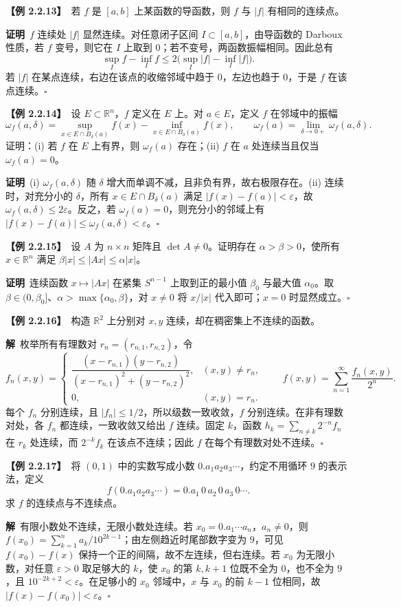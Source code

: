 \documentclass[UTF8,a4paper,11pt]{ctexart}
\newcommand{\ex}[1]{\par\medskip\noindent\textbf{【例 #1】}\ }
\newcommand{\pf}{\par\noindent\textbf{证明}\ }
\newcommand{\sol}{\par\noindent\textbf{解}\ }
\begin{document}
\ex{2.2.13}若 $f$ 是 $[a,b]$ 上某函数的导函数，则 $f$ 与 $|f|$ 有相同的连续点。
\pf $f$ 连续处 $|f|$ 显然连续。对任意闭子区间 $I\subset[a,b]$，由导函数的 Darboux 性质，若 $f$ 变号，则它在 $I$ 上取到 $0$；若不变号，两函数振幅相同。因此总有
\[
\sup_I f-\inf_I f\le 2\bigl(\sup_I|f|-\inf_I|f|\bigr).
\]
若 $|f|$ 在某点连续，右边在该点的收缩邻域中趋于 $0$，左边也趋于 $0$，于是 $f$ 在该点连续。\hfill$\square$

\ex{2.2.14}设 $E\subset\mathbb R^n$，$f$ 定义在 $E$ 上。对 $a\in E$，定义 $f$ 在邻域中的振幅
\[
\omega_f(a,\delta)=\sup_{x\in E\cap B_\delta(a)}f(x)-\inf_{x\in E\cap B_\delta(a)}f(x),\qquad
\omega_f(a)=\lim_{\delta\to0+}\omega_f(a,\delta).
\]
证明：(i) 若 $f$ 在 $E$ 上有界，则 $\omega_f(a)$ 存在；(ii) $f$ 在 $a$ 处连续当且仅当 $\omega_f(a)=0$。
\pf (i) $\omega_f(a,\delta)$ 随 $\delta$ 增大而单调不减，且非负有界，故右极限存在。(ii) 连续时，对充分小的 $\delta$，所有 $x\in E\cap B_\delta(a)$ 满足 $|f(x)-f(a)|<\varepsilon$，故 $\omega_f(a,\delta)\le2\varepsilon$。反之，若 $\omega_f(a)=0$，则充分小的邻域上有 $|f(x)-f(a)|\le\omega_f(a,\delta)<\varepsilon$。\hfill$\square$

\ex{2.2.15}设 $A$ 为 $n\times n$ 矩阵且 $\det A\ne0$。证明存在 $\alpha>\beta>0$，使所有 $x\in\mathbb R^n$ 满足 $\beta|x|\le|Ax|\le\alpha|x|$。
\pf 连续函数 $x\mapsto|Ax|$ 在紧集 $S^{n-1}$ 上取到正的最小值 $\beta_0$ 与最大值 $\alpha_0$。取 $\beta\in(0,\beta_0]$、$\alpha>\max\{\alpha_0,\beta\}$，对 $x\ne0$ 将 $x/|x|$ 代入即可；$x=0$ 时显然成立。\hfill$\square$

\ex{2.2.16}构造 $\mathbb R^2$ 上分别对 $x,y$ 连续，却在稠密集上不连续的函数。
\sol 枚举所有有理数对 $r_n=(r_{n,1},r_{n,2})$，令
\[
f_n(x,y)=\begin{cases}
\dfrac{(x-r_{n,1})(y-r_{n,2})}{(x-r_{n,1})^2+(y-r_{n,2})^2},&(x,y)\ne r_n,\\[3pt]
0,&(x,y)=r_n.
\end{cases}
\qquad f(x,y)=\sum_{n=1}^{\infty}\frac{f_n(x,y)}{2^n}.
\]
每个 $f_n$ 分别连续，且 $|f_n|\le1/2$，所以级数一致收敛，$f$ 分别连续。在非有理数对处，各 $f_n$ 都连续，一致收敛又给出 $f$ 连续。固定 $k$，函数 $h_k=\sum_{n\ne k}2^{-n}f_n$ 在 $r_k$ 处连续，而 $2^{-k}f_k$ 在该点不连续；因此 $f$ 在每个有理数对处不连续。\hfill$\square$

\ex{2.2.17}将 $(0,1)$ 中的实数写成小数 $0.a_1a_2a_3\cdots$，约定不用循环 $9$ 的表示法，定义
\[
f(0.a_1a_2a_3\cdots)=0.a_1\,0\,a_2\,0\,a_3\,0\cdots.
\]
求 $f$ 的连续点与不连续点。
\sol 有限小数处不连续，无限小数处连续。若 $x_0=0.a_1\cdots a_n$，$a_n\ne0$，则 $f(x_0)=\sum_{k=1}^n a_k/10^{2k-1}$；由左侧趋近时尾部数字变为 $9$，可见 $f(x_0)-f(x)$ 保持一个正的间隔，故不左连续，但右连续。若 $x_0$ 为无限小数，对任意 $\varepsilon>0$ 取足够大的 $k$，使 $x_0$ 的第 $k,k+1$ 位既不全为 $0$，也不全为 $9$，且 $10^{-2k+2}<\varepsilon$。在足够小的 $x_0$ 邻域中，$x$ 与 $x_0$ 的前 $k-1$ 位相同，故 $|f(x)-f(x_0)|<\varepsilon$。\hfill$\square$
\end{document}
